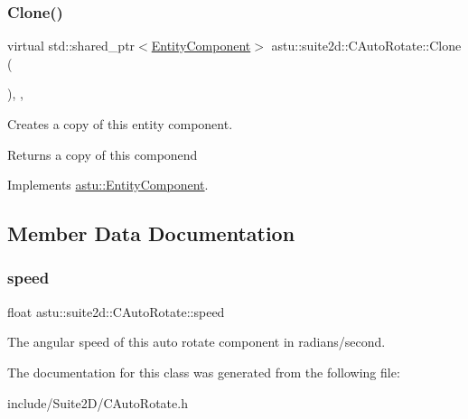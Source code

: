 \subsubsection{\texorpdfstring{Clone()}{Clone()}}
{\footnotesize\ttfamily virtual std\+::shared\+\_\+ptr$<$\hyperlink{classastu_1_1EntityComponent}{Entity\+Component}$>$ astu\+::suite2d\+::\+C\+Auto\+Rotate\+::\+Clone (\begin{DoxyParamCaption}{ }\end{DoxyParamCaption})\hspace{0.3cm}{\ttfamily [inline]}, {\ttfamily [override]}, {\ttfamily [virtual]}}

Creates a copy of this entity component.

\begin{DoxyReturn}{Returns}
a copy of this componend 
\end{DoxyReturn}


Implements \hyperlink{classastu_1_1EntityComponent_afeddb5a899d831255a9a4f07269f3b2d}{astu\+::\+Entity\+Component}.



\subsection{Member Data Documentation}
\mbox{\label{classastu_1_1suite2d_1_1CAutoRotate_a5757c237b7c9b14fdc43ff763e7b899b}} 
\subsubsection{\texorpdfstring{speed}{speed}}
{\footnotesize\ttfamily float astu\+::suite2d\+::\+C\+Auto\+Rotate\+::speed}

The angular speed of this auto rotate component in radians/second. 

The documentation for this class was generated from the following file\+:\begin{DoxyCompactItemize}
\item 
include/\+Suite2\+D/C\+Auto\+Rotate.\+h\end{DoxyCompactItemize}
